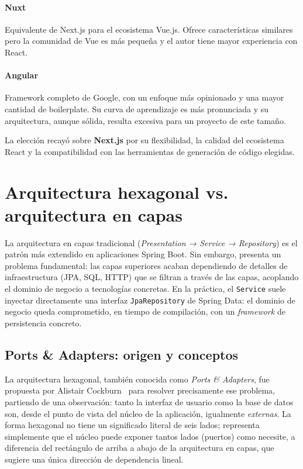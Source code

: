 \paragraph{Nuxt} Equivalente de Next.js para el ecosistema Vue.js. Ofrece
características similares pero la comunidad de Vue es más pequeña y el autor
tiene mayor experiencia con React.

\paragraph{Angular} Framework completo de Google, con un enfoque más opinionado
y una mayor cantidad de boilerplate. Su curva de aprendizaje es más pronunciada
y su arquitectura, aunque sólida, resulta excesiva para un proyecto de este
tamaño.

La elección recayó sobre \textbf{Next.js} por su flexibilidad, la calidad del
ecosistema React y la compatibilidad con las herramientas de generación de código
elegidas.

\section{Arquitectura hexagonal vs. arquitectura en capas}
\label{sec:arquitectura_comparativa}

La arquitectura en capas tradicional (\textit{Presentation → Service → Repository})
es el patrón más extendido en aplicaciones Spring Boot. Sin embargo, presenta
un problema fundamental: las capas superiores acaban dependiendo de detalles de
infraestructura (JPA, SQL, HTTP) que se filtran a través de las capas, acoplando
el dominio de negocio a tecnologías concretas. En la práctica, el \texttt{Service}
suele inyectar directamente una interfaz \texttt{JpaRepository} de Spring Data:
el dominio de negocio queda comprometido, en tiempo de compilación, con un
\textit{framework} de persistencia concreto.

\subsection{Ports \& Adapters: origen y conceptos}

La arquitectura hexagonal, también conocida como \textit{Ports \& Adapters},
fue propuesta por Alistair Cockburn~\cite{cockburn2005hexagonal} para resolver
precisamente ese problema, partiendo de una observación: tanto la interfaz de
usuario como la base de datos son, desde el punto de vista del núcleo de la
aplicación, igualmente \textit{externas}. La forma hexagonal no tiene un
significado literal de seis lados; representa simplemente que el núcleo puede
exponer tantos lados (puertos) como necesite, a diferencia del rectángulo de
arriba a abajo de la arquitectura en capas, que sugiere una única dirección de
dependencia lineal.

